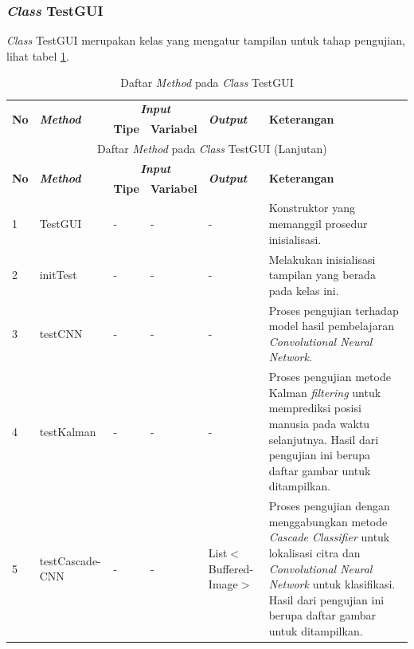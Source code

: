 \subsubsection{\textit{Class} TestGUI}
\noindent \textit{Class} TestGUI merupakan kelas yang mengatur tampilan untuk tahap pengujian, lihat tabel \ref{tbl:classTestGUI}.
\begingroup
\setlength{\LTleft}{-20cm plus -1fill}
\setlength{\LTright}{\LTleft}
\begin{small}
\begin{longtable}{|p{0.4cm}|p{2cm}|p{1.8cm}|p{1.8cm}|p{1.7cm}|p{3.55cm}|}
	\caption{Daftar \textit{Method} pada \textit{Class} TestGUI \label{tbl:classTestGUI}}\\
	\hline
	\multirow{2}{*}{\textbf{No}} & \multirow{2}{*}{\textit{\textbf{Method}}} & \multicolumn{2}{c|}{\textit{\textbf{Input}}} & \multirow{2}{*}{\textit{\textbf{Output}}} & 
	\multirow{2}{*}{\textbf{Keterangan}}\\
	\cline{3-4}
	& & \textbf{Tipe} & \textbf{Variabel} & & \\
	\endfirsthead
	\multicolumn{6}{c}{\textbf{\tablename~\thetable} Daftar \textit{Method} pada \textit{Class} TestGUI (Lanjutan)} \\
	\hline
	\multirow{2}{*}{\textbf{No}} & \multirow{2}{*}{\textit{\textbf{Method}}} & \multicolumn{2}{c|}{\textit{\textbf{Input}}} & \multirow{2}{*}{\textit{\textbf{Output}}} & 
	\multirow{2}{*}{\textbf{Keterangan}}\\
	\cline{3-4}
	& & \textbf{Tipe} & \textbf{Variabel} & & \\
	\endhead
	\hline
	1 & TestGUI & - & - & - & Konstruktor yang memanggil prosedur inisialisasi.\\
	\hline
	2 & initTest & - & - & - & Melakukan inisialisasi tampilan yang berada pada kelas ini.\\
	\hline
	3 & testCNN & - & - & - & Proses pengujian terhadap model hasil pembelajaran \textit{Convolutional Neural Network}.\\
	\hline
	4 & testKalman & - & - & - & Proses pengujian metode Kalman \textit{filtering} untuk memprediksi posisi manusia pada waktu selanjutnya. Hasil dari pengujian ini berupa daftar gambar untuk ditampilkan.\\
	\hline
	5 & testCascade-\newline CNN & - & - & List$<$\newline Buffered-\newline Image\newline $>$ & Proses pengujian dengan menggabungkan metode \textit{Cascade Classifier} untuk lokalisasi citra dan \textit{Convolutional Neural Network} untuk klasifikasi. Hasil dari pengujian ini berupa daftar gambar untuk ditampilkan.\\

\end{longtable}
\end{small}
